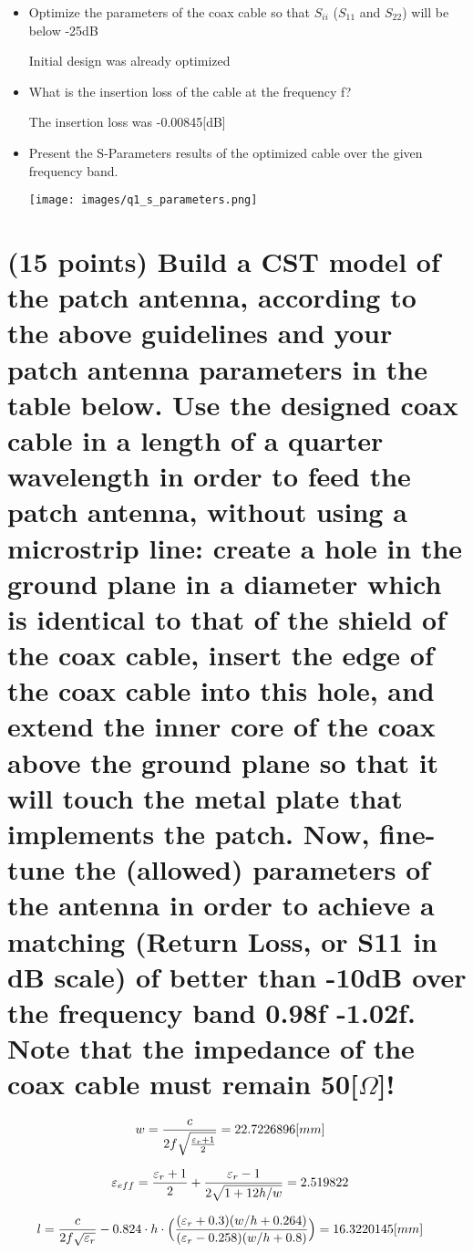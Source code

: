 \documentclass[12pt, letterpaper]{article}
\begin{document}
\begin{itemize}
  \item Optimize the parameters of the coax cable so that $S_{ii}$ ($S_{11}$ and $S_{22}$) will be below -25dB

  {\color{blue}Initial design was already optimized}

  \item What is the insertion loss of the cable at the frequency f?

  {\color{blue} The insertion loss was -0.00845[dB]}

  \item Present the S-Parameters results of the optimized cable over the given frequency band.

  \texttt{[image: images/q1\_s\_parameters.png]}
\end{itemize}

\section{(15 points) Build a CST model of the patch antenna, according to the above guidelines and your patch antenna parameters in the table below. Use the designed coax cable in a length of a quarter wavelength in order to feed the patch antenna, without using a microstrip line: create a hole in the ground plane in a diameter which is identical to that of the shield of the coax cable, insert the edge of the coax cable into this hole, and extend the inner core of the coax above the ground plane so that it will touch the metal plate that implements the patch. Now, fine-tune the (allowed) parameters of the antenna in order to achieve a matching (Return Loss, or S11 in dB scale) of better than -10dB over the frequency band 0.98f -1.02f. Note that the impedance of the coax cable must remain 50[$\Omega$]!}

\begin{align}
  w&=
  {
    c
    \over
    2f\sqrt{\varepsilon_r+1\over2}
  }
  =
  22.7226896[mm]
\end{align}

\begin{align}
  \varepsilon_{eff}&=
  {\varepsilon_r+1\over2}
  +
  {\varepsilon_r-1\over2\sqrt{1+12h/w}}
  =
  2.519822
\end{align}

\begin{align}
  l&=
  {c\over2f\sqrt{\varepsilon_r}}
  -
  0.824\cdot h
  \cdot
  \Bigl({
    (\varepsilon_r+0.3)(w/h+0.264)
    \over
    (\varepsilon_r-0.258)(w/h+0.8)
  }\Bigr)
  =
  16.3220145[mm]
\end{align}
\end{document}
